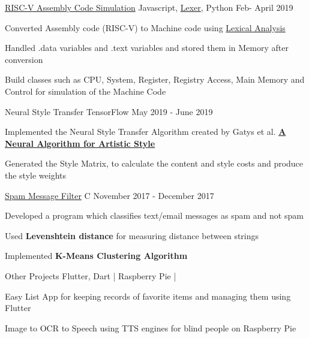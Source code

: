 \begin{cventries}
    \projects
    {} %
    {\href{https://github.com/vinx-2105/assembly-simulator}{RISC-V Assembly Code Simulation}} %
    {Javascript, \href{https://github.com/aaditmshah/lexer}{Lexer}, Python} %
    {Feb- April 2019} %
    {
      \begin{cvitems} %
        \item {Converted Assembly code (RISC-V) to Machine code using \href{https://github.com/aaditmshah/lexer}{Lexical Analysis}}
        \item {Handled .data variables and .text variables and stored them in Memory after conversion}
        \item {Build classes such as CPU, System, Register, Registry Access, Main Memory and Control for simulation of the Machine Code}
      \end{cvitems}
      }
      
      \projects
    {} %
    {{Neural Style Transfer}} %
    {TensorFlow} %
    {May 2019 - June 2019} %
    {
      \begin{cvitems} %
        \item {Implemented the Neural Style Transfer Algorithm created by Gatys et al. \href{https://arxiv.org/abs/1508.06576}{\textbf{A Neural Algorithm for Artistic Style}}}
        \item {Generated the Style Matrix, to calculate the content and style costs and produce the style weights}
      \end{cvitems}
    }
      
      \projects
      {} %
      {\href{https://github.com/parthgoyal123/Queen-McCluskey}{Spam Message Filter}} %
      {C} %
      {November 2017 - December 2017} %
      {
        \begin{cvitems} %
          \item {Developed a program which classifies text/email messages as spam and not spam}
          \item {Used \textbf{Levenshtein distance} for measuring distance between strings} 
          \item {Implemented \textbf{K-Means Clustering Algorithm}}
        \end{cvitems}
        }


  \projects
    {} %
    {{Other Projects}} %
    {Flutter, Dart | Raspberry Pie | } %
    {} %
    {
      \begin{cvitems} %
        \item {Easy List App for keeping records of favorite items and managing them using Flutter}
        \item {Image to OCR to Speech using TTS engines for blind people on Raspberry Pie}
      \end{cvitems}
    }


\end{cventries}
